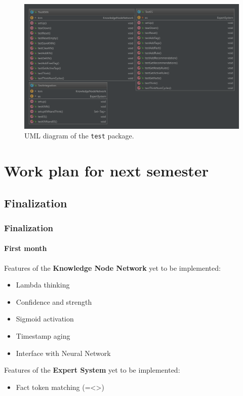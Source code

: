 \documentclass{beamer}
\newcommand{\code}[1]{\texttt{#1}}
\begin{document}
	\begin{frame}
		\begin{figure}
			\centering
			\includegraphics[width=\textwidth]{figures/uml_test.pdf}
			\caption
			{UML diagram of the \code{test} package.}
			\label{fig:uml_test}
		\end{figure}
	\end{frame}
	
	\section[Next semester]{Work plan for next semester}
	
	\subsection{Finalization}
	
	\begin{frame}
		\frametitle{Finalization}
		\framesubtitle{First month}
		Features of the \textbf{Knowledge Node Network} yet to be implemented:
		\begin{itemize}
			\item Lambda thinking
			\item Confidence and strength
			\item Sigmoid activation
			\item Timestamp aging
			\item Interface with Neural Network
		\end{itemize}
		Features of the \textbf{Expert System} yet to be implemented:
		\begin{itemize}
			\item Fact token matching (=\quad \textless \quad \textgreater)
		\end{itemize}
	\end{frame}
\end{document}
